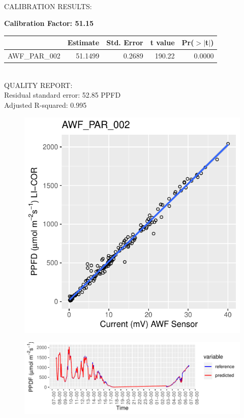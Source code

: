 \documentclass[oneside]{report}
\begin{document}
\hrulefill\\
CALIBRATION RESULTS:\\


\begin{center}
\textbf{\large{Calibration Factor: 51.15}}\\
\end{center}
\begin{table}[ht]
\centering
\begin{tabular}{rrrrr}
  \hline
 & Estimate & Std. Error & t value & Pr($>$$|$t$|$) \\ 
  \hline
AWF\_PAR\_002 & 51.1499 & 0.2689 & 190.22 & 0.0000 \\ 
   \hline
\end{tabular}
\end{table}



\hrulefill\\
QUALITY REPORT:\\
Residual standard error: 52.85 PPFD\\
Adjusted R-squared: 0.995



\begin{figure}[H]
  \centering
  \includegraphics[width=0.4\linewidth]{graphs/AWF_PAR_002_scatter.pdf}
\end{figure}




\begin{figure}[H]
  \centering
  \includegraphics[width=0.7\linewidth]{graphs/AWF_PAR_002_pred.pdf}
\end{figure}
\end{document}
